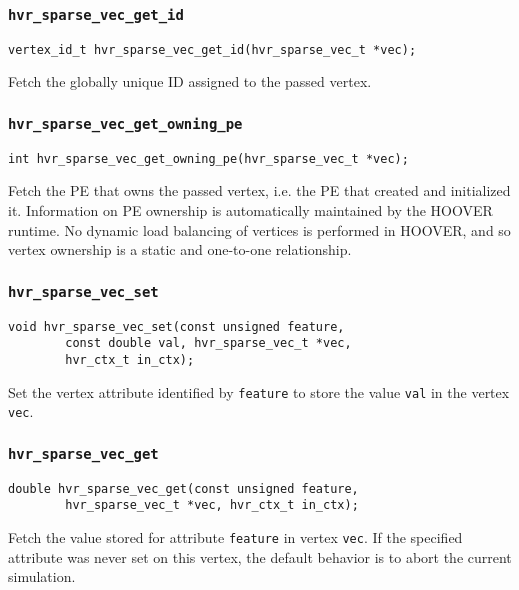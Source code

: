 \subsubsection{\texttt{hvr\_sparse\_vec\_get\_id}}

\begin{verbatim}
vertex_id_t hvr_sparse_vec_get_id(hvr_sparse_vec_t *vec);
\end{verbatim}

Fetch the globally unique ID assigned to the passed vertex.

\subsubsection{\texttt{hvr\_sparse\_vec\_get\_owning\_pe}}

\begin{verbatim}
int hvr_sparse_vec_get_owning_pe(hvr_sparse_vec_t *vec);
\end{verbatim}

Fetch the PE that owns the passed vertex, i.e. the PE that created and
initialized it. Information on PE ownership is automatically maintained by the
HOOVER runtime. No dynamic load balancing of vertices is performed in HOOVER,
and so vertex ownership is a static and one-to-one relationship.

\subsubsection{\texttt{hvr\_sparse\_vec\_set}}

\begin{verbatim}
void hvr_sparse_vec_set(const unsigned feature,
        const double val, hvr_sparse_vec_t *vec,
        hvr_ctx_t in_ctx);
\end{verbatim}

Set the vertex attribute identified by \texttt{feature} to store the value
\texttt{val} in the vertex \texttt{vec}.

\subsubsection{\texttt{hvr\_sparse\_vec\_get}}

\begin{verbatim}
double hvr_sparse_vec_get(const unsigned feature,
        hvr_sparse_vec_t *vec, hvr_ctx_t in_ctx);
\end{verbatim}

Fetch the value stored for attribute \texttt{feature} in vertex \texttt{vec}. If
the specified attribute was never set on this vertex, the default behavior is to
abort the current simulation.


